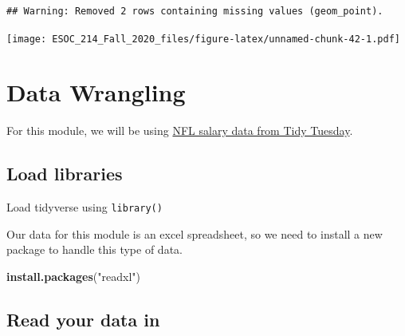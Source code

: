 \documentclass[
]{book}
\newenvironment{Shaded}{\begin{snugshade}}{\end{snugshade}}
\newcommand{\DataTypeTok}[1]{\textcolor[rgb]{0.13,0.29,0.53}{#1}}
\newcommand{\KeywordTok}[1]{\textcolor[rgb]{0.13,0.29,0.53}{\textbf{#1}}}
\newcommand{\NormalTok}[1]{#1}
\newcommand{\OperatorTok}[1]{\textcolor[rgb]{0.81,0.36,0.00}{\textbf{#1}}}
\newcommand{\StringTok}[1]{\textcolor[rgb]{0.31,0.60,0.02}{#1}}
\begin{document}
\begin{Shaded}
\end{Shaded}

\begin{verbatim}
## Warning: Removed 2 rows containing missing values (geom_point).
\end{verbatim}

\texttt{[image: ESOC\_214\_Fall\_2020\_files/figure-latex/unnamed-chunk-42-1.pdf]}

\hypertarget{data-wrangling}{%
\chapter{Data Wrangling}\label{data-wrangling}}

For this module, we will be using \href{https://github.com/rfordatascience/tidytuesday/tree/master/data/2018/2018-04-09}{NFL salary data from Tidy Tuesday}.

\hypertarget{load-libraries}{%
\section{Load libraries}\label{load-libraries}}

Load tidyverse using \texttt{library()}

Our data for this module is an excel spreadsheet, so we need to install a new package to handle this type of data.

\begin{Shaded}
\begin{Highlighting}[]
\KeywordTok{install.packages}\NormalTok{(}\StringTok{"readxl"}\NormalTok{)}
\end{Highlighting}
\end{Shaded}

\hypertarget{read-your-data-in}{%
\section{Read your data in}\label{read-your-data-in}}
\end{document}
